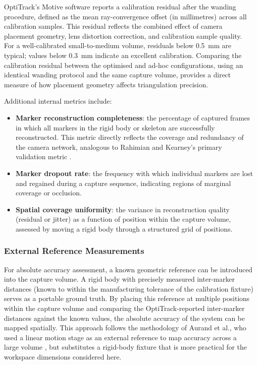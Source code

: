 OptiTrack's Motive software reports a calibration residual after the wanding procedure, defined as the mean ray-convergence offset (in millimetres) across all calibration samples. This residual reflects the combined effect of camera placement geometry, lens distortion correction, and calibration sample quality. For a well-calibrated small-to-medium volume, residuals below 0.5~mm are typical; values below 0.3~mm indicate an excellent calibration. Comparing the calibration residual between the optimised and ad-hoc configurations, using an identical wanding protocol and the same capture volume, provides a direct measure of how placement geometry affects triangulation precision.

Additional internal metrics include:
\begin{itemize}
    \item \textbf{Marker reconstruction completeness}: the percentage of captured frames in which all markers in the rigid body or skeleton are successfully reconstructed. This metric directly reflects the coverage and redundancy of the camera network, analogous to Rahimian and Kearney's primary validation metric \parencite{rahimianOptimalCameraPlacement2017}.
    \item \textbf{Marker dropout rate}: the frequency with which individual markers are lost and regained during a capture sequence, indicating regions of marginal coverage or occlusion.
    \item \textbf{Spatial coverage uniformity}: the variance in reconstruction quality (residual or jitter) as a function of position within the capture volume, assessed by moving a rigid body through a structured grid of positions.
\end{itemize}

\subsubsection{External Reference Measurements}

For absolute accuracy assessment, a known geometric reference can be introduced into the capture volume. A rigid body with precisely measured inter-marker distances (known to within the manufacturing tolerance of the calibration fixture) serves as a portable ground truth. By placing this reference at multiple positions within the capture volume and comparing the OptiTrack-reported inter-marker distances against the known values, the absolute accuracy of the system can be mapped spatially. This approach follows the methodology of Aurand et al., who used a linear motion stage as an external reference to map accuracy across a large volume \parencite{aurandAccuracyMapOptical2017}, but substitutes a rigid-body fixture that is more practical for the workspace dimensions considered here.

